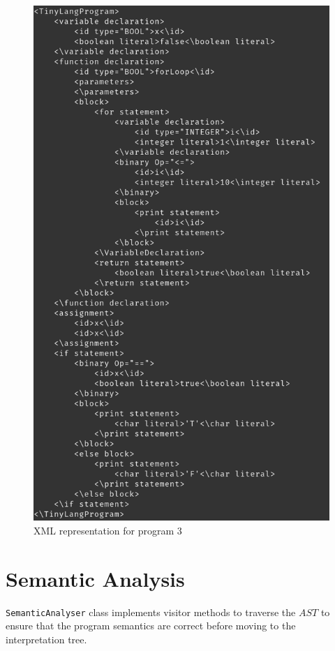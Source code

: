 \begin{figure}[H]
    \centering
    \includegraphics[scale=0.5]{Task345/images/xmlOutput3.png}
    \caption{XML representation for program 3}
    \label{fig:xml tree 3}
\end{figure}





\chapter{Semantic Analysis}
\verb!SemanticAnalyser! class implements visitor methods to traverse the $AST$ to ensure that the program semantics are correct before moving to the interpretation tree.

